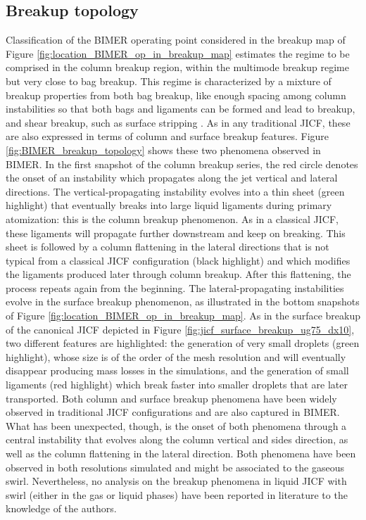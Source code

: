 \subsection{Breakup topology}
\label{ch8:subsec_BIMER_breakup_topology}

Classification of the BIMER operating point considered in the breakup map of Figure \ref{fig:location_BIMER_op_in_breakup_map} estimates the regime to be comprised in the column breakup region, within the multimode breakup regime but very close to bag breakup. This regime is characterized by a mixture of breakup properties from both bag breakup, like enough spacing among column instabilities so that both bags and ligaments can be formed and lead to breakup, and shear breakup, such as surface stripping . As in any traditional JICF, these are also expressed in terms of column and surface breakup features. Figure \ref{fig:BIMER_breakup_topology} shows these two phenomena observed in BIMER. In the first snapshot of the column breakup series, the red circle denotes the onset of an instability which propagates along the jet vertical and lateral directions. The vertical-propagating instability evolves into a thin sheet (green highlight) that eventually breaks into large liquid ligaments during primary atomization: this is the column breakup phenomenon. As in a classical JICF, these ligaments will propagate further downstream and keep on breaking. This sheet is followed by a column flattening in the lateral directions that is not typical from a classical JICF configuration (black highlight) and which modifies the ligaments produced later through column breakup. After this flattening, the process repeats again from the beginning. The lateral-propagating instabilities evolve in the surface breakup phenomenon, as illustrated in the bottom snapshots of Figure \ref{fig:location_BIMER_op_in_breakup_map}. As in the surface breakup of the canonical JICF depicted in Figure \ref{fig:jicf_surface_breakup_ug75_dx10}, two different features are highlighted: the generation of very small droplets (green highlight), whose size is of the order of the mesh resolution and will eventually disappear producing mass losses in the simulations, and the generation of small ligaments (red highlight) which break faster into smaller droplets that are later transported. Both column and surface breakup phenomena have been widely observed in traditional JICF configurations and are also captured in BIMER. What has been unexpected, though, is the onset of both phenomena through a central instability that evolves along the column vertical and sides direction, as well as the column flattening in the lateral direction. Both phenomena have been observed in both resolutions simulated and might be associated to the gaseous swirl. Nevertheless, no analysis on the breakup phenomena in liquid JICF with swirl (either in the gas or liquid phases) have been reported in literature to the knowledge of the authors.%

